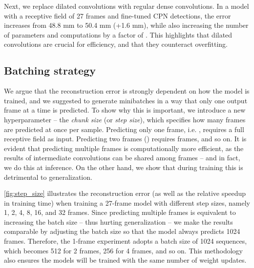 \documentclass[10pt,twocolumn,letterpaper]{article}
\begin{document}
Next, we replace dilated convolutions with regular dense convolutions. 
In a model with a receptive field of 27 frames and fine-tuned CPN detections, the error increases from 48.8 mm to 50.4 mm (+1.6 mm), while also increasing the number of parameters and computations by a factor of . 
This highlights that dilated convolutions are crucial for efficiency, and that they counteract overfitting.


\subsection{Batching strategy}
\label{app:batching}

We argue that the reconstruction error is strongly dependent on how the model is trained, and we suggested to generate minibatches in a way that only one output frame at a time is predicted. 
To show why this is important, we introduce a new hyperparameter -- the \emph{chunk size}  (or \emph{step size}), which specifies how many frames are predicted at once per sample.
Predicting only one frame, i.e. , requires a full receptive field  as input. 
Predicting two frames () requires  frames, and so on. 
It is evident that predicting multiple frames is computationally more efficient, as the results of intermediate convolutions can be shared among frames -- and in fact, we do this at inference. 
On the other hand, we show that during training this is detrimental to generalization. 

\autoref{fig:step_size} illustrates the reconstruction error (as well as the relative speedup in training time) when training a 27-frame model with different step sizes, namely 1, 2, 4, 8, 16, and 32 frames. 
Since predicting multiple frames is equivalent to increasing the batch size -- thus hurting generalization \cite{keskar:large:2017} -- we make the results comparable by adjusting the batch size so that the model always predicts 1024 frames. 
Therefore, the 1-frame experiment adopts a batch size of 1024 sequences, which becomes 512 for 2 frames, 256 for 4 frames, and so on. 
This methodology also ensures the models will be trained with the same number of weight updates.
\end{document}
